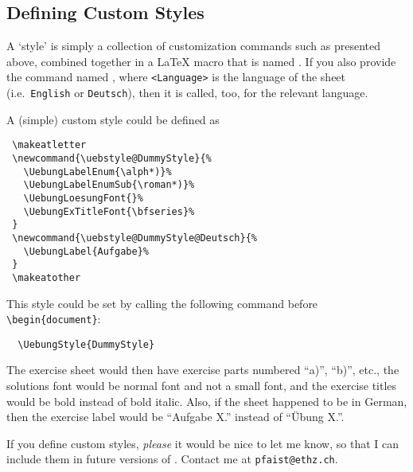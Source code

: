 \documentclass[11pt,a4paper]{article}
\begin{document}


\subsection{Defining Custom Styles}
\label{sec:customstyles}

A `style' is simply a collection of customization commands such as presented above,
combined together in a \LaTeX{} macro that is named
. If you also provide the command named
, where \texttt{<Language>} is the
language of the sheet (i.e.\ \texttt{English} or \texttt{Deutsch}), then it is called,
too, for the relevant language.

A (simple) custom style could be defined as
\begin{pkgverbatim}
\begin{verbatim}
 \makeatletter
 \newcommand{\uebstyle@DummyStyle}{%
   \UebungLabelEnum{\alph*)}%
   \UebungLabelEnumSub{\roman*)}%
   \UebungLoesungFont{}%
   \UebungExTitleFont{\bfseries}%
 }
 \newcommand{\uebstyle@DummyStyle@Deutsch}{%
   \UebungLabel{Aufgabe}%
 }
 \makeatother
\end{verbatim}
\end{pkgverbatim}

This style could be set by calling the following command before \verb|\begin{document}|:
\begin{pkgverbatim}
\begin{verbatim}
  \UebungStyle{DummyStyle}
\end{verbatim}
\end{pkgverbatim}

The exercise sheet would then have exercise parts numbered ``a)'', ``b)'', etc., the
solutions font would be normal font and not a small font, and the exercise titles would be
bold instead of bold italic. Also, if the sheet happened to be in German, then the
exercise label would be ``Aufgabe X.'' instead of ``\"Ubung X.''.

\begin{pkgnotice}
  If you define custom styles, \emph{please} it would be nice to let me know, so that I
  can include them in future versions of \ethuebung{}. Contact me at
  \texttt{pfaist{@}ethz.ch}.
\end{pkgnotice}
\end{document}
